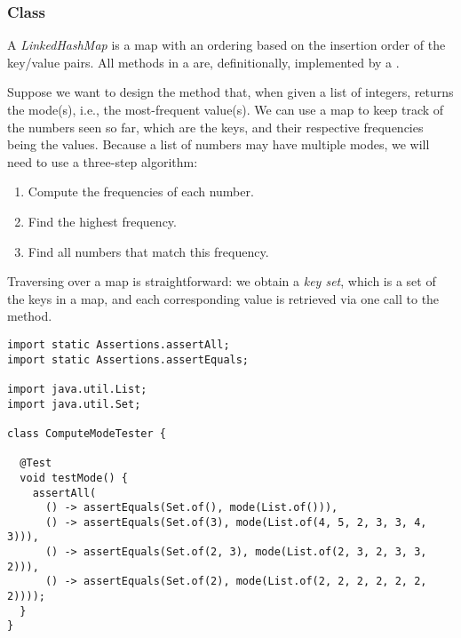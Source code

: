 \subsubsection*{ Class}
A \emph{LinkedHashMap} is a map with an ordering based on the insertion order of the key/value pairs. 
All methods in a  are, definitionally, implemented by a .

Suppose we want to design the  method that, when given a list of integers, returns the mode(s), i.e., the most-frequent value(s). 
We can use a map to keep track of the numbers seen so far, which are the keys, and their respective frequencies being the values. 
Because a list of numbers may have multiple modes, we will need to use a three-step algorithm:

\begin{enumerate}
  \item Compute the frequencies of each number.
  \item Find the highest frequency.
  \item Find all numbers that match this frequency.
\end{enumerate}

Traversing over a map is straightforward: we obtain a \emph{key set}, which is a set of the keys in a map, and each corresponding value is retrieved via one call to the  method.

\begin{lstlisting}[language=MyJava]
import static Assertions.assertAll;
import static Assertions.assertEquals;

import java.util.List;
import java.util.Set;

class ComputeModeTester {

  @Test
  void testMode() {
    assertAll(
      () -> assertEquals(Set.of(), mode(List.of())),  
      () -> assertEquals(Set.of(3), mode(List.of(4, 5, 2, 3, 3, 4, 3))),
      () -> assertEquals(Set.of(2, 3), mode(List.of(2, 3, 2, 3, 3, 2))),
      () -> assertEquals(Set.of(2), mode(List.of(2, 2, 2, 2, 2, 2, 2))));
  }
}
\end{lstlisting}

